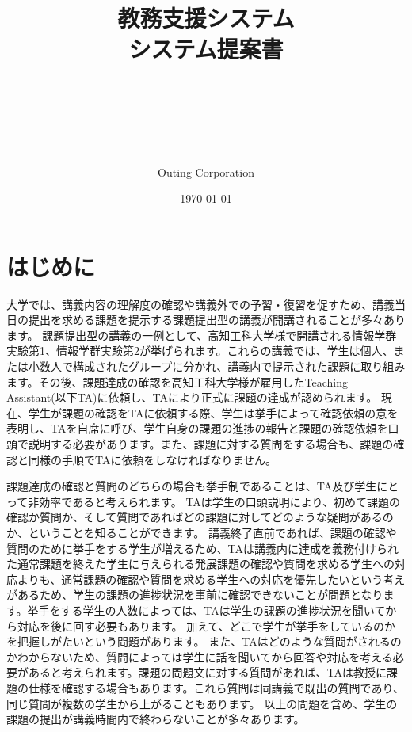 \documentclass[a4j,titlepage]{ujarticle}
\title{
{教務支援システム
\\
システム提案書}
\author{\\
\\
\\
\\
\\
Outing Corporation}
\date{\today}
}
\begin{document}
\maketitle


\tableofcontents

\clearpage

\section{はじめに}

大学では、講義内容の理解度の確認や講義外での予習・復習を促すため、講義当日の提出を求める課題を提示する課題提出型の講義が開講されることが多々あります。
課題提出型の講義の一例として、高知工科大学様で開講される情報学群実験第1、情報学群実験第2が挙げられます。これらの講義では、学生は個人、または小数人で構成されたグループに分かれ、講義内で提示された課題に取り組みます。その後、課題達成の確認を高知工科大学様が雇用したTeaching Assistant(以下TA)に依頼し、TAにより正式に課題の達成が認められます。
現在、学生が課題の確認をTAに依頼する際、学生は挙手によって確認依頼の意を表明し、TAを自席に呼び、学生自身の課題の進捗の報告と課題の確認依頼を口頭で説明する必要があります。また、課題に対する質問をする場合も、課題の確認と同様の手順でTAに依頼をしなければなりません。

課題達成の確認と質問のどちらの場合も挙手制であることは、TA及び学生にとって非効率であると考えられます。
TAは学生の口頭説明により、初めて課題の確認か質問か、そして質問であればどの課題に対してどのような疑問があるのか、ということを知ることができます。
講義終了直前であれば、課題の確認や質問のために挙手をする学生が増えるため、TAは講義内に達成を義務付けられた通常課題を終えた学生に与えられる発展課題の確認や質問を求める学生への対応よりも、通常課題の確認や質問を求める学生への対応を優先したいという考えがあるため、学生の課題の進捗状況を事前に確認できないことが問題となります。挙手をする学生の人数によっては、TAは学生の課題の進捗状況を聞いてから対応を後に回す必要もあります。
加えて、どこで学生が挙手をしているのかを把握しがたいという問題があります。
また、TAはどのような質問がされるのかわからないため、質問によっては学生に話を聞いてから回答や対応を考える必要があると考えられます。課題の問題文に対する質問があれば、TAは教授に課題の仕様を確認する場合もあります。これら質問は同講義で既出の質問であり、同じ質問が複数の学生から上がることもあります。
以上の問題を含め、学生の課題の提出が講義時間内で終わらないことが多々あります。
\end{document}
